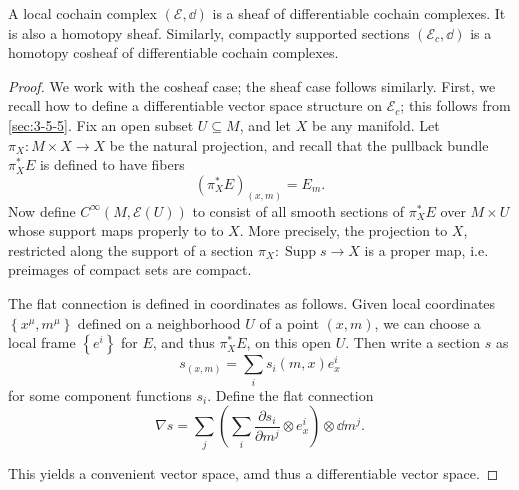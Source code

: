 \begin{lemma}\label{lma:6-5-2}
	A local cochain complex $(\mathcal{E} ,\dd )$ is a sheaf of differentiable cochain complexes. It is also a homotopy sheaf. Similarly, compactly supported sections $(\mathcal{E} _c,\dd )$ is a homotopy cosheaf of differentiable cochain complexes.
\end{lemma}
\begin{proof}
	We work with the cosheaf case; the sheaf case follows similarly. First, we recall how to define a differentiable vector space structure on $\mathcal{E} _c$; this follows from \cref{sec:3-5-5}. Fix an open subset $U\subseteq M$, and let $X$ be any manifold. Let $\pi_X : M\times X \to X$ be the natural projection, and recall that the pullback bundle $\pi ^*_XE$ is defined to have fibers
	\[
		\left( \pi ^*_XE \right)_{(x,m)} =E_m
	.\]
	Now define $C^\infty (M,\mathcal{E} (U))$ to consist of all smooth sections of $\pi ^*_XE$ over $M\times U$ whose support maps properly to to $X$. More precisely, the projection to $X$, restricted along the support of a section $\pi _X : \operatorname{Supp} s \to X$ is a proper map, i.e. preimages of compact sets are compact.

	The flat connection is defined in coordinates as follows. Given local coordinates $\left\{ x^\mu ,m^\mu  \right\} $ defined on a neighborhood $U$ of a point $(x,m)$, we can choose a local frame $\left\{ e^i \right\} $ for $E$, and thus $\pi ^*_XE$, on this open $U$. Then write a section $s$ as
	\[
		s_{(x,m)} =\sum_{i} s_i(m,x)e^i_x
	\]
	for some component functions $s_i$. Define the flat connection
	\[
		\nabla s = \sum_{j} \left( \sum_{i} \frac{\partial s_i}{\partial m^j} \otimes e^i_x \right) \otimes \dd m^j
	.\]

	This yields a convenient vector space, amd thus a differentiable vector space.


\end{proof}
